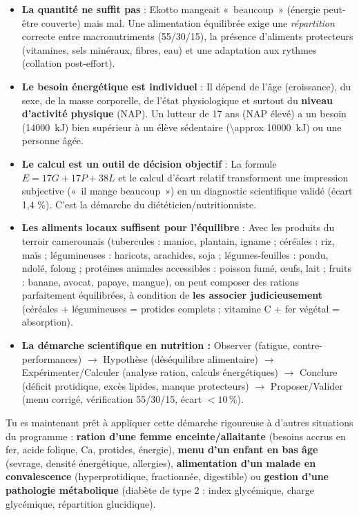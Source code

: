 \documentclass[11pt]{article}
\begin{document}
\begin{itemize}
\item \textbf{La quantité ne suffit pas} : Ekotto mangeait «~beaucoup~» (énergie peut-être couverte) mais mal. Une alimentation équilibrée exige une \emph{répartition} correcte entre macronutriments (55/30/15), la présence d'aliments protecteurs (vitamines, sels minéraux, fibres, eau) et une adaptation aux rythmes (collation post-effort).
\item \textbf{Le besoin énergétique est individuel} : Il dépend de l'âge (croissance), du sexe, de la masse corporelle, de l'état physiologique et surtout du \textbf{niveau d'activité physique} (NAP). Un lutteur de 17 ans (NAP élevé) a un besoin (\SI{14000}{kJ}) bien supérieur à un élève sédentaire (\SI{\approx 10000}{kJ}) ou une personne âgée.
\item \textbf{Le calcul est un outil de décision objectif} : La formule $E = 17G + 17P + 38L$ et le calcul d'écart relatif transforment une impression subjective («~il mange beaucoup~») en un diagnostic scientifique validé (écart 1,4 \%). C'est la démarche du diététicien/nutritionniste.
\item \textbf{Les aliments locaux suffisent pour l'équilibre} : Avec les produits du terroir camerounais (tubercules : manioc, plantain, igname ; céréales : riz, maïs ; légumineuses : haricots, arachides, soja ; légumes-feuilles : pondu, ndolé, folong ; protéines animales accessibles : poisson fumé, œufs, lait ; fruits : banane, avocat, papaye, mangue), on peut composer des rations parfaitement équilibrées, à condition de \textbf{les associer judicieusement} (céréales + légumineuses = protides complets ; vitamine C + fer végétal = absorption).
\item \textbf{La démarche scientifique en nutrition :} Observer (fatigue, contre-performances) $\rightarrow$ Hypothèse (déséquilibre alimentaire) $\rightarrow$ Expérimenter/Calculer (analyse ration, calculs énergétiques) $\rightarrow$ Conclure (déficit protidique, excès lipides, manque protecteurs) $\rightarrow$ Proposer/Valider (menu corrigé, vérification 55/30/15, écart $<10\,\%$).
\end{itemize}

Tu es maintenant prêt à appliquer cette démarche rigoureuse à d'autres situations du programme : \textbf{ration d'une femme enceinte/allaitante} (besoins accrus en fer, acide folique, Ca, protides, énergie), \textbf{menu d'un enfant en bas âge} (sevrage, densité énergétique, allergies), \textbf{alimentation d'un malade en convalescence} (hyperprotidique, fractionnée, digestible) ou \textbf{gestion d'une pathologie métabolique} (diabète de type 2 : index glycémique, charge glycémique, répartition glucidique).
\end{document}
